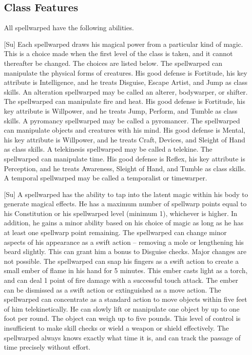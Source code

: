 \subsection{Class Features}
All spellwarped have the following abilities.

[Su]
Each spellwarped draws his magical power from a particular kind of magic.
This is a choice made when the first level of the class is taken, and it cannot thereafter be changed.
The choices are listed below.
    The spellwarped can manipulate the physical forms of creatures.
    His good defense is Fortitude, his key attribute is Intelligence, and he treats Disguise, Escape Artist, and Jump as class skills.
    An alteration spellwarped may be called an alterer, bodywarper, or shifter.
    The spellwarped can manipulate fire and heat.
    His good defense is Fortitude, his key attribute is Willpower, and he treats Jump, Perform, and Tumble as class skills.
    A pyromancy spellwarped may be called a pyromancer.
    The spellwarped can manipulate objects and creatures with his mind.
    His good defense is Mental, his key attribute is Willpower, and he treats Craft, Devices, and Sleight of Hand as class skills.
    A telekinesis spellwarped may be called a telekine.
    The spellwarped can manipulate time.
    His good defense is Reflex, his key attribute is Perception, and he treats Awareness, Sleight of Hand, and Tumble as class skills.
    A temporal spellwarped may be called a temporalist or timewarper.

[Su]
A spellwarped has the ability to tap into the latent magic within his body to generate magical effects.
He has a maximum number of spellwarp points equal to his Constitution or his spellwarped level (minimum 1), whichever is higher.
In addition, he gains a minor ability based on his choice of magic as long as he has at least one spellwarp point remaining.
    The spellwarped can change minor aspects of his appearance as a swift action -- removing a mole or lengthening his beard slightly.
    This can grant him a  bonus to Disguise checks.
    Major changes are not possible.
    The spellwarped can snap his fingers as a swift action to create a small ember of flame in his hand for 5 minutes.
    This ember casts light as a torch, and can deal 1 point of fire damage with a successful touch attack.
    The ember can be dismissed as a swift action or extinguished as a move action.
    The spellwarped can concentrate as a standard action to move objects within five feet of him telekinetically.
    He can slowly lift or manipulate one object by up to one foot per round.
    The object can weigh up to five pounds.
    This level of control is insufficient to make skill checks or wield a weapon or shield effectively.
    The spellwarped always knows exactly what time it is, and can track the passage of time precisely without effort.


